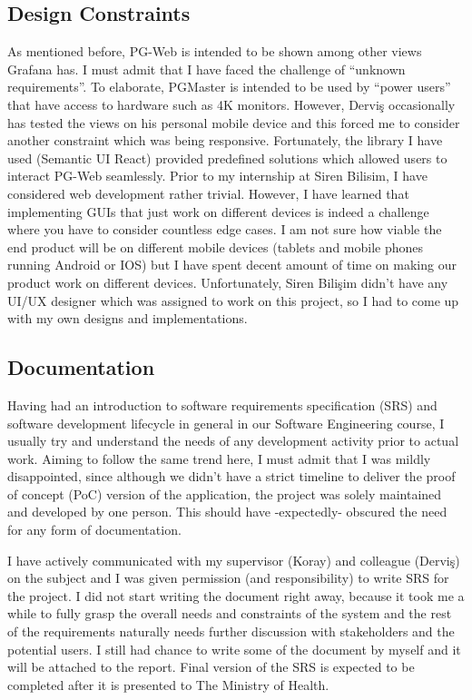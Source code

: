 \subsection{Design Constraints}

As mentioned before, PG-Web is intended to be shown among other views Grafana 
has. I must admit that I have faced the challenge of ``unknown requirements''. 
To elaborate, PGMaster is intended to be used by ``power users'' that have 
access to hardware such as 4K monitors. However, Derviş occasionally has 
tested the views on his personal mobile device and this forced me to consider 
another constraint which was being responsive. Fortunately, the library I have 
used (Semantic UI React) provided predefined solutions which allowed users to 
interact PG-Web seamlessly. Prior to my internship at Siren Bilisim, I have 
considered web development rather trivial. However, I have learned that 
implementing GUIs that just work on different devices is indeed a challenge 
where you have to consider countless edge cases. I am not sure how viable the 
end product will be on different mobile devices (tablets and mobile phones 
running Android or IOS) but I have spent decent amount of time on making our 
product work on different devices. Unfortunately, Siren Bilişim didn't have 
any UI/UX designer which was assigned to work on this project, so I had to 
come up with my own designs and implementations.

\subsection{Documentation}

Having had an introduction to software requirements specification (SRS) and 
software development lifecycle in general in our Software Engineering course, 
I usually try and understand the needs of any development activity prior to 
actual work. Aiming to follow the same trend here, I must admit that I was 
mildly disappointed, since although we didn't have a strict timeline to 
deliver the proof of concept (PoC) version of the application, the project 
was solely maintained and developed by one person. This should have 
-expectedly- obscured the need for any form of documentation.
\par I have actively communicated with my supervisor (Koray) and colleague 
(Derviş) on the subject and I was given permission (and responsibility) to 
write SRS for the project. I did not start writing the document right away, 
because it took me a while to fully grasp the overall needs and constraints 
of the system and the rest of the requirements naturally needs further 
discussion with stakeholders and the potential users. I still had chance to 
write some of the document by myself and it will be attached to the report. 
Final version of the SRS is expected to be completed after it is presented 
to The Ministry of Health.

